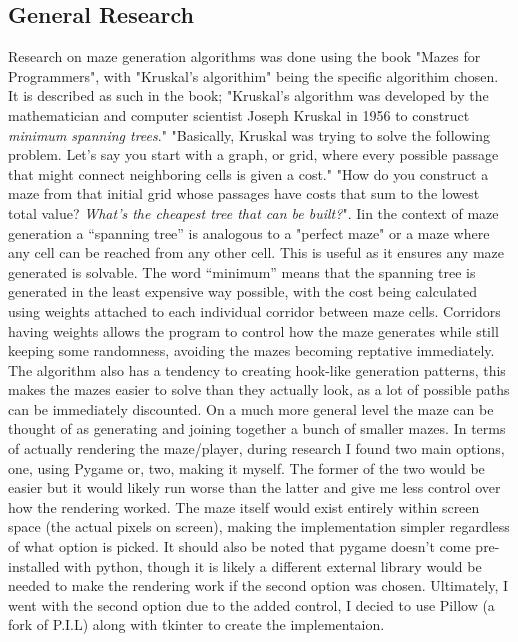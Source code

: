 \documentclass{article}
\begin{document}
\subsection{General Research}
Research on maze generation algorithms was done using the book "Mazes for Programmers", with "Kruskal's algorithim" being the specific algorithim
chosen. It is described as such in the book; "Kruskal's algorithm was developed by the mathematician and computer scientist Joseph Kruskal in 1956 to
construct \emph{minimum spanning trees}." "Basically, Kruskal was trying to solve the following problem. Let's say you start with a graph, or grid, where
every possible passage that might connect neighboring cells is given a cost." "How do you construct a maze from that initial grid whose passages have costs
that sum to the lowest total value? \emph{What's the cheapest tree that can be built?}". Iin the context of maze generation a ``spanning tree'' is analogous to a "perfect maze" or
a maze where any cell can be reached from any other cell. This is useful as it ensures any maze generated is solvable. The word ``minimum'' means that the 
spanning tree is generated in the least expensive way possible, with the cost being calculated using weights attached to each individual corridor between maze
cells. Corridors having weights allows the program to control how the maze generates while still keeping some randomness, avoiding the mazes becoming reptative immediately.
The algorithm also has a tendency to creating hook-like generation patterns, this makes the mazes easier to solve than they actually look, as a lot of possible paths can
be immediately discounted. On a much more general level the maze can be thought of as generating and joining together a bunch of smaller mazes.
\linebreak
\linebreak
In terms of actually rendering the maze/player, during research I found two main options, one, using Pygame or, two, making it myself. The former of the
two would be easier but it would likely run worse than the latter and give me less control over how the rendering worked. The maze itself would exist entirely 
within screen space (the actual pixels on screen), making the implementation simpler regardless of what option is picked. It should also be noted that pygame
doesn't come pre-installed with python, though it is likely a different external library would be needed to make the rendering work if the
second option was chosen.
Ultimately, I went with the second option due to the added control, I decied to use Pillow (a fork of P.I.L) along with tkinter to create the
implementaion.
\\
\end{document}
